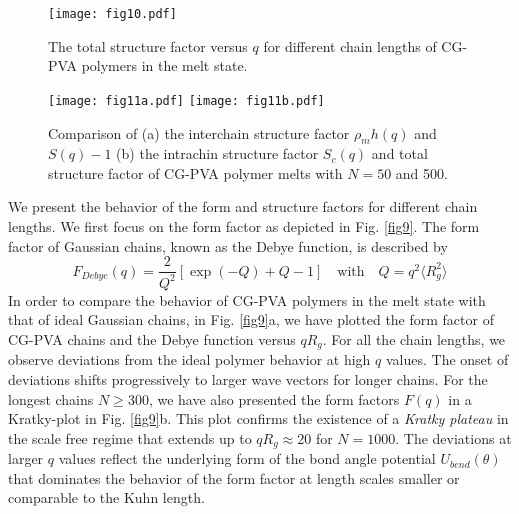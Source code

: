 \documentclass[pre,showpacs,notitlepage,twocolumn]{revtex4-1}
\begin{document}
\begin{figure}[t]
 \texttt{[image: fig10.pdf]}
\caption{The total structure factor versus $q$ for different chain lengths of CG-PVA polymers in the melt state.}
\label{fig10} 
\end{figure}
%
%
\begin{figure*}[t]
\texttt{[image: fig11a.pdf]}
\texttt{[image: fig11b.pdf]}
\caption{Comparison of (a) the interchain structure factor $\rho_m h(q)$ and $S(q)-1$  (b) the intrachin structure factor  $S_c(q)$ and total structure factor  of CG-PVA polymer melts with $N=50$ and 500.  }
\label{fig11} 
\end{figure*}
%
  We present the  behavior of the form and  structure factors for different chain lengths. We first focus on the form factor as depicted in   Fig. \ref{fig9}. 
   The form factor of Gaussian chains,  known as  the  Debye function, is described by \cite{Rubinstein}
  \begin{equation}
F_{Debye}(q)= \frac{2}{Q^2}  \left[ \exp(-Q)+Q-1   \right]   \quad \text{with} \quad  Q=q^2 \langle R_g^2\rangle
\label{eq:SQDebye}
 \end{equation}
%
 In order to compare the behavior of CG-PVA  polymers in the melt state with that of ideal Gaussian chains, in  Fig. \ref{fig9}a, we have plotted the form factor of CG-PVA chains 
 and the Debye function versus $qR_g$. 
 For all the chain lengths, we  observe deviations from  the ideal polymer behavior at high $q$ values. The onset of deviations  shifts progressively
 to larger wave vectors for longer chains. For the longest chains  $N \ge 300$, we  have also  presented the form factors $F(q)$  in a Kratky-plot in Fig. \ref{fig9}b.
 This plot confirms the existence of a  \emph{Kratky plateau} in the scale free regime that extends up to  $qR_g \approx20$ for  $N=1000$.
  The deviations at larger $q$ values reflect the 
 underlying form of the  bond angle potential  $U_{bend} (\theta)$ that dominates the behavior of the form factor at length scales smaller or  comparable to the Kuhn length. 
 
  
  \iffalse   Fig. \ref{fig7}a, we  
  have plotted $S_c(q)=NF(q)$ verus $q$ for different chain lengths.  We find that for small $q$  values ( $ q \frac{2\pi} {R_g} \ll 1)$ in the Guinier regime  the behavior of $S_c(q)$ is  well described by
  $S_c(q)=N(1-q^2 \langle R_g^2\rangle/3)$.  On the other hand, at larger  $q$ values,   $S_c(q)$ of all the chain lengths coincide. Particularly, we observe the scaling behavior  of 
  the form $S_c(q) \propto q^{-1}$ for the range $ \frac{2\pi} {\ell_K}  <q  \ll \frac{2\pi} {\ell_b}$ that is the fingerprint of  rod-like conformation for chain portions with  lengths shorter than their Kuhn length. 
 For long chains  with $N \ge 300$, we observe a scaling behavior $q^{-2}$ at intermediate $q$ values ( $ \frac{2\pi} {R_g}  <q  \ll \frac{2\pi} {\ell_K}$) that is the characteristic scaling of Gaussian coils (ideal chains) with
 $S_c(q) \propto q^{-1/\nu}$ with $\nu=1/2$.   
 \fi
 
\end{document}
